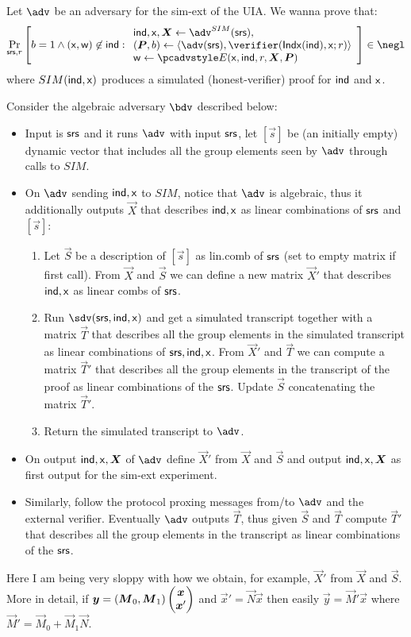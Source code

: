 \documentclass[runningheads,11pt]{llncs}
\begin{document}
Let $\adv$ be an adversary for the sim-ext of the UIA.
We wanna prove that:
\[
			\Prob[\srs,r]{
					b=1 \wedge (\inp,\wit)\not\in\ind:
					\begin{array}{l}
						\ind,\inp, \vec X \gets\adv^{SIM}(\srs),\\
					(\vec P,b) \gets \braket{\adv(\srs),\verifier(\Iphp(\ind),\inp;r)}\\
					\wit \gets \Ext(\inp,\ind,r,\vec X,\vec P)
					\end{array}
					}\in\negl
\]
where $SIM( {\mathsf{ind}},\mathsf{x} )$ produces a simulated (honest-verifier) proof for ${\mathsf{ind}}$ and $\mathsf{x}$.

Consider the algebraic adversary $\bdv$ described below:
\begin{itemize}
	\item Input is $\mathsf{srs}$ and it runs $\adv$ with input $\mathsf{srs}$, let $[\vec s]$ be (an
		initially empty)	dynamic vector that includes all the group elements seen by $\adv$ through calls to
		$SIM$.
	\item On $\adv$ sending ${\mathsf{ind}},\mathsf{x}$ to $SIM$, notice that $\adv$ is algebraic, thus it
		additionally outputs $\vec X$ that describes ${\mathsf{ind}},\mathsf{x}$ as linear combinations of
		$\mathsf{srs}$ and $[\vec s]$:
		\begin{enumerate}
			\item Let $\vec S$ be a description of $[\vec s]$ as lin.comb of $\mathsf{srs}$ (set to empty
				matrix if first call).
				From $\vec X$ and $\vec S$ we can define a new matrix $\vec X'$ that describes
				${\mathsf{ind}},\mathsf{x}$ as linear combs of $\mathsf{srs}$.
			\item Run $\sdv(\srs,\ind,\inp)$ and get a simulated transcript together with a matrix $\vec T$
				 that describes all the group elements in the simulated transcript as linear combinations of $\mathsf{srs},{\mathsf{ind}},\mathsf{x}$.
					From $\vec X'$ and $\vec T$ we can compute a matrix $\vec T'$ that describes all
					the group elements in the transcript of the proof as linear combinations of the
					$\mathsf{srs}$. Update $\vec S$ concatenating the matrix $\vec T'$.
			\item Return the simulated transcript to $\adv$.
		\end{enumerate}
	\item On output $\ind,\inp,\vec X$ of $\adv$ define $\vec X'$ from $\vec X$ and $\vec S$
		and output $\ind,\inp,\vec X$ as first output for the sim-ext experiment.
	\item Similarly, follow the protocol proxing messages from/to $\adv$ and the external verifier.
		Eventually $\adv$ outputs $\vec T$, thus given $\vec S$ and $\vec T$ compute $\vec T'$
		that describes all the group elements in the transcript as linear combinations of the
		$\mathsf{srs}$.
\end{itemize}


Here I am being very sloppy with how we obtain, for example, $\vec X'$ from $\vec X$ and
$\vec S$.
More in detail, if 
$\vec y = (\vec M_0, \vec M_1) \pmtrx{\vec x\\\vec x'}$ and $\vec x' = \vec N \vec x$ then
easily $\vec y = \vec M' \vec x$ where $\vec M' = \vec M_0 + \vec M_1\vec N$.
\end{document}
